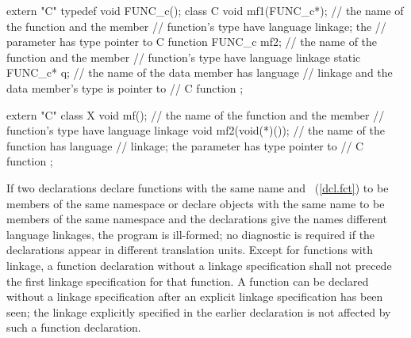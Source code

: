 \begin{codeblock}
extern "C" typedef void FUNC_c();
class C {
   void mf1(FUNC_c*);           // the name of the function  and the member
                                // function's type have \Cpp language linkage; the
                                // parameter has type pointer to C function
   FUNC_c mf2;                  // the name of the function  and the member
                                // function's type have \Cpp language linkage
   static FUNC_c* q;            // the name of the data member  has \Cpp language
                                // linkage and the data member's type is pointer to
                                // C function
};

extern "C" {
  class X {
  void mf();                    // the name of the function  and the member
                                // function's type have \Cpp language linkage
  void mf2(void(*)());          // the name of the function  has \Cpp language
                                // linkage; the parameter has type pointer to
                                // C function
  };
}
\end{codeblock}
\exitexample

\pnum
If two declarations declare functions with the same name and
~(\ref{dcl.fct}) to be members of the same
namespace or declare objects with the same name to be members of the same
namespace and the declarations give the names different language linkages, the
program is ill-formed; no diagnostic is required if the declarations appear in
different translation units.
%
Except for functions with \Cpp linkage, a function declaration without a
linkage specification shall not precede the first linkage specification
for that function. A function can be declared without a linkage
specification after an explicit linkage specification has been seen; the
linkage explicitly specified in the earlier declaration is not affected
by such a function declaration.

